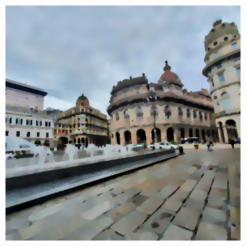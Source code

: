 \begin{figure}
\begin{minipage}{\textwidth}
\begin{subfigure}{.3\textwidth}
\end{subfigure}\hfill%
\begin{subfigure}{.3\textwidth}%
\includegraphics[width=\textwidth]{atelier/breg_cat/cat-20.png}
%
\end{subfigure}
\end{minipage}\\%


\end{figure}
